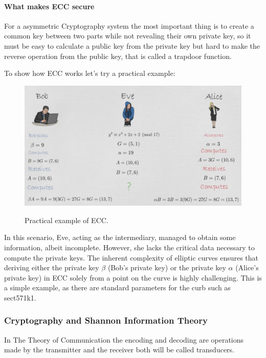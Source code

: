 \paragraph{What makes ECC secure}

For a asymmetric Cryptography system the most important thing is to create a common key between two parts while not revealing their own private key, so it must be easy to calculate a public key from the private key but hard to make the reverse operation from the public key, that is called a trapdoor function.

To show how ECC works let's try a practical example:
\begin{figure}[H]
  \includegraphics[width=\linewidth]{images/expl.png}
  \caption{Practical example of ECC.}\cite{pierce_ecdh}
  \label{fig:Practical example of ECC}
\end{figure}
In this scenario, Eve, acting as the intermediary, managed to obtain some information, albeit incomplete. However, she lacks the critical data necessary to compute the private keys. The inherent complexity of elliptic curves ensures that deriving either the private key $\beta$ (Bob's private key) or the private key $\alpha$ (Alice's private key) in ECC solely from a point on the curve is highly challenging.
This is a simple example, as there are standard parameters for the curb such as sect571k1. \cite{secg2010}


\subsubsection{Cryptography and Shannon Information Theory} \cite{shannon1948mathematical}

In The Theory of Communication the encoding and decoding are operations made by the transmitter and the receiver both will be called transducers.

